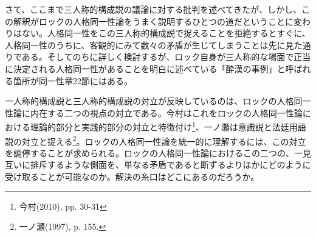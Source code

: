 \documentclass[a4j,oneside]{jsbook}
\begin{document}
\par
さて、ここまで三人称的構成説の議論に対する批判を述べてきたが、しかし、この解釈がロックの人格同一性論をうまく説明するひとつの道だということに変わりはない。人格同一性をこの三人称的構成説で捉えることを拒絶するとすぐに、人格同一性のうちに、客観的にみて数々の矛盾が生じてしまうことは先に見た通りである。そしてのちに詳しく検討するが、ロック自身が三人称的な場面で正当に決定される人格同一性があることを明白に述べている「酔漢の事例」と呼ばれる箇所が同一性章22節にはある。
\par
一人称的構成説と三人称的構成説の対立が反映しているのは、ロックの人格同一性論に内在する二つの視点の対立である。今村はこれをロックの人格同一性論における理論的部分と実践的部分の対立と特徴付け\footnote{今村(2010), pp. 30-31}、一ノ瀬は意識説と法廷用語説の対立と捉える\footnote{一ノ瀬(1997), p. 155.}。ロックの人格同一性論を統一的に理解するには、この対立を調停することが求められる。ロックの人格同一性論におけるこの二つの、一見互いに排斥するような側面を、単なる矛盾であると断ずるよりほかにどのように受け取ることが可能なのか。解決の糸口はどこにあるのだろうか。
\end{document}
